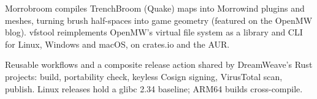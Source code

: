 \documentclass{resume}
\begin{document}
\begin{bullets}
  \item Morrobroom compiles TrenchBroom (Quake) maps into Morrowind plugins and meshes, turning brush half-spaces into game geometry (featured on the OpenMW blog). vfstool reimplements OpenMW's virtual file system as a library and CLI for Linux, Windows and macOS, on crates.io and the AUR.
\end{bullets}

\begin{bullets}
  \item Reusable workflows and a composite release action shared by DreamWeave's Rust projects: build, portability check, keyless Cosign signing, VirusTotal scan, publish. Linux releases hold a glibc 2.34 baseline; ARM64 builds cross-compile.
\end{bullets}




\makefooter
\end{document}
